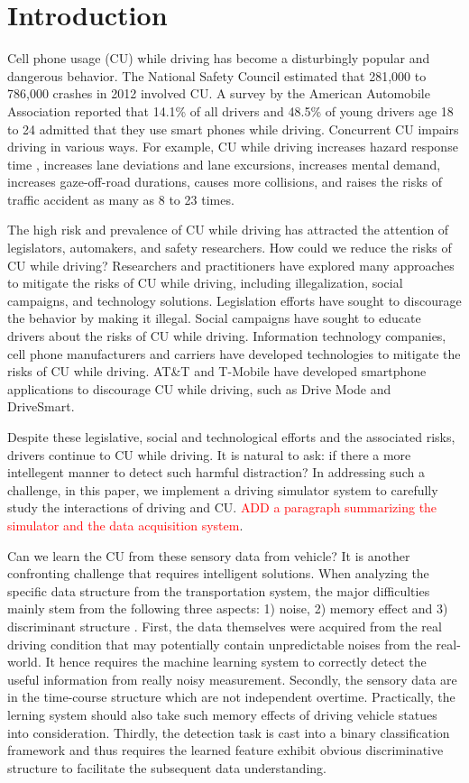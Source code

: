 \documentclass[journal]{IEEEtran}
\begin{document}
\section{Introduction}
Cell phone usage (CU) while driving has become a disturbingly popular and dangerous behavior. The National Safety Council  estimated that 281,000 to 786,000 crashes in 2012 involved CU. A survey by the American Automobile Association reported that 14.1\% of all drivers and 48.5\% of young drivers age 18 to 24 admitted that they use smart phones while driving.  Concurrent CU impairs driving in various ways. For example, CU while driving increases hazard response time , increases lane deviations and lane excursions, increases mental demand, increases gaze-off-road durations, causes more collisions, and raises the risks of traffic accident as many as 8 to 23 times.



 
The high risk and prevalence of CU while driving has attracted the attention of legislators, automakers, and safety researchers. How could we reduce the risks of CU while driving? Researchers and practitioners have explored many approaches to mitigate the risks of CU while driving, including illegalization, social campaigns, and technology solutions. Legislation efforts have sought to discourage the behavior by making it illegal. Social campaigns have sought to educate drivers about the risks of CU while driving. Information technology companies, cell phone manufacturers and carriers have developed technologies to mitigate the risks of CU while driving. AT\&T and T-Mobile have developed smartphone applications to discourage CU while driving, such as Drive Mode and DriveSmart.  


Despite these legislative, social and technological efforts and the associated risks, drivers continue to CU while driving.  It is natural to ask: if there a more intellegent manner to detect such harmful distraction?   In addressing such a challenge, in this paper, we implement a driving simulator system to carefully study the interactions of driving and CU.
\textcolor{red} {ADD a paragraph summarizing the simulator and the data acquisition system}.


Can we learn the CU from these  sensory data from vehicle? It is another confronting challenge that requires intelligent solutions. When analyzing the specific data structure from the transportation system,  the major difficulties mainly stem from the following three aspects: 1) noise, 2) memory effect \cite{kim2003autonomous} and 3) discriminant structure . First, the data themselves were acquired from the real driving condition that may potentially contain unpredictable noises from the real-world. It hence requires the machine learning system to correctly detect the useful information from really noisy measurement. Secondly, the sensory data are in the time-course structure which are not independent overtime. Practically, the lerning system should also take such memory effects of driving vehicle statues into consideration. Thirdly, the detection task is cast into a binary classification framework and thus requires the learned feature exhibit obvious discriminative structure to facilitate the subsequent data understanding. 
\end{document}
